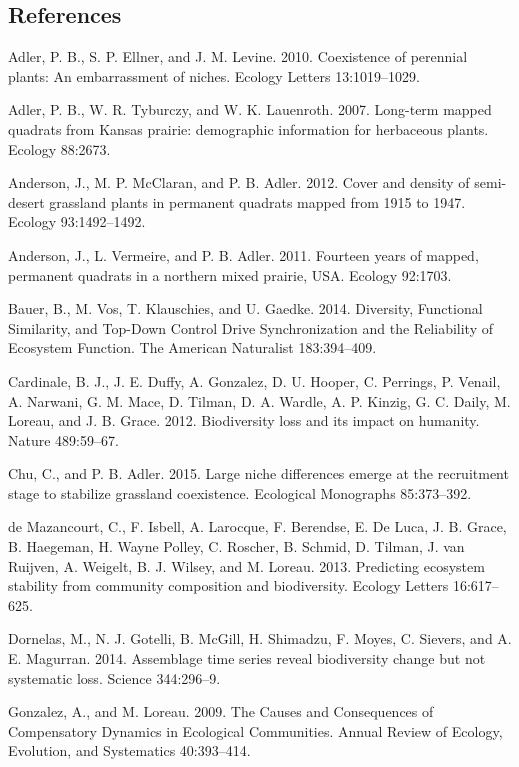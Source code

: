 \documentclass[12pt,]{article}
\begin{document}
\setlength{\parindent}{0ex} 


\subsection*{References}\label{references}

Adler, P. B., S. P. Ellner, and J. M. Levine. 2010. Coexistence of
perennial plants: An embarrassment of niches. Ecology Letters
13:1019--1029.

Adler, P. B., W. R. Tyburczy, and W. K. Lauenroth. 2007. Long-term
mapped quadrats from Kansas prairie: demographic information for
herbaceous plants. Ecology 88:2673.

Anderson, J., M. P. McClaran, and P. B. Adler. 2012. Cover and density
of semi-desert grassland plants in permanent quadrats mapped from 1915
to 1947. Ecology 93:1492--1492.

Anderson, J., L. Vermeire, and P. B. Adler. 2011. Fourteen years of
mapped, permanent quadrats in a northern mixed prairie, USA. Ecology
92:1703.

Bauer, B., M. Vos, T. Klauschies, and U. Gaedke. 2014. Diversity,
Functional Similarity, and Top-Down Control Drive Synchronization and
the Reliability of Ecosystem Function. The American Naturalist
183:394--409.

Cardinale, B. J., J. E. Duffy, A. Gonzalez, D. U. Hooper, C. Perrings,
P. Venail, A. Narwani, G. M. Mace, D. Tilman, D. A. Wardle, A. P.
Kinzig, G. C. Daily, M. Loreau, and J. B. Grace. 2012. Biodiversity loss
and its impact on humanity. Nature 489:59--67.

Chu, C., and P. B. Adler. 2015. Large niche differences emerge at the
recruitment stage to stabilize grassland coexistence. Ecological
Monographs 85:373--392.

{{de Mazancourt}}, C., F. Isbell, A. Larocque, F. Berendse, E. {De
Luca}, J. B. Grace, B. Haegeman, H. {Wayne Polley}, C. Roscher, B.
Schmid, D. Tilman, J. van Ruijven, A. Weigelt, B. J. Wilsey, and M.
Loreau. 2013. Predicting ecosystem stability from community composition
and biodiversity. Ecology Letters 16:617--625.

Dornelas, M., N. J. Gotelli, B. McGill, H. Shimadzu, F. Moyes, C.
Sievers, and A. E. Magurran. 2014. Assemblage time series reveal
biodiversity change but not systematic loss. Science 344:296--9.

Gonzalez, A., and M. Loreau. 2009. The Causes and Consequences of
Compensatory Dynamics in Ecological Communities. Annual Review of
Ecology, Evolution, and Systematics 40:393--414.
\end{document}
